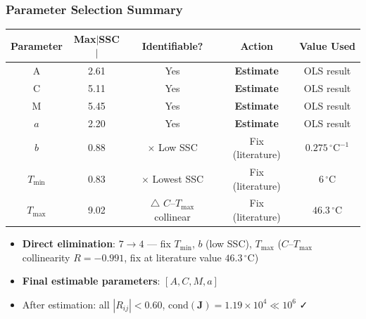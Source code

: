 \documentclass[10pt,aspectratio=169]{beamer}
\begin{document}
\begin{frame}
	\frametitle{Parameter Selection Summary}
	\begin{table}[ht]
		\centering
		\footnotesize
		\begin{tabular}{ccccc}
			\toprule
			Parameter & Max$|$SSC$|$ & Identifiable? & Action & Value Used \\
			\midrule
			A & 2.61 & \checkmark Yes & \textbf{Estimate} & OLS result \\
			C & 5.11 & \checkmark Yes & \textbf{Estimate} & OLS result \\
			M & 5.45 & \checkmark Yes & \textbf{Estimate} & OLS result \\
			$a$ & 2.20 & \checkmark Yes & \textbf{Estimate} & OLS result \\
			$b$ & 0.88 & $\times$ Low SSC & Fix (literature) & $0.275\,{}^{\circ}\text{C}^{-1}$ \\
			$T_{\min}$ & 0.83 & $\times$ Lowest SSC & Fix (literature) & $6\,{}^{\circ}\text{C}$ \\
			$T_{\max}$ & 9.02 & $\triangle$ $C$--$T_{\max}$ collinear & Fix (literature) & $46.3\,{}^{\circ}\text{C}$ \\
			\bottomrule
		\end{tabular}
	\end{table}
	\vspace{0.3em}
	\begin{itemize}
		\item \textbf{Direct elimination}: $7 \to 4$ — fix $T_{\min}$, $b$ (low SSC), $T_{\max}$ ($C$--$T_{\max}$ collinearity $R=-0.991$, fix at literature value $46.3\,{}^{\circ}\text{C}$)
		\item \textbf{Final estimable parameters}: $[A, C, M, a]$
		\item After estimation: all $|R_{ij}| < 0.60$, $\text{cond}(\mathbf{J}) = 1.19\times10^4 \ll 10^6$ ✓
	\end{itemize}
\end{frame}

\end{document}
